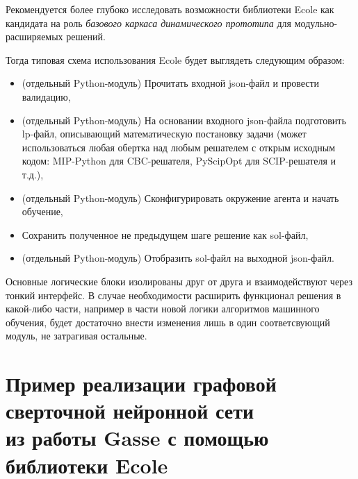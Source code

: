\documentclass[%
	11pt,
	a4paper,
	utf8,
		]{article}
\begin{document}
Рекомендуется более глубоко исследовать возможности библиотеки Ecole как кандидата на роль \emph{базового каркаса динамического прототипа} для модульно-расширяемых решений.

Тогда типовая схема использования Ecole будет выглядеть следующим образом:
\begin{itemize}
	\item (отдельный Python-модуль) Прочитать входной json-файл и провести валидацию,

	\item (отдельный Python-модуль) На основании входного json-файла подготовить lp-файл, описывающий математическую постановку задачи (может использоваться любая обертка над любым решателем с открым исходным кодом: MIP-Python для CBC-решателя, PyScipOpt для SCIP-решателя и т.д.),

	\item (отдельный Python-модуль) Сконфигурировать окружение агента и начать обучение,

	\item Сохранить полученное не предыдущем шаге решение как sol-файл,

	\item (отдельный Python-модуль) Отобразить sol-файл на выходной json-файл.
\end{itemize}

Основные логические блоки изолированы друг от друга и взаимодействуют через тонкий интерфейс. В случае необходимости расширить функционал решения в какой-либо части, например в части новой логики алгоритмов машинного обучения, будет достаточно внести изменения лишь в один соответсвующий модуль, не затрагивая остальные.

\appendix

\section{Пример реализации графовой сверточной нейронной сети \\из работы Gasse \cite{gasse:comb-opt-GCNN-2019} с помощью библиотеки Ecole}
\end{document}
